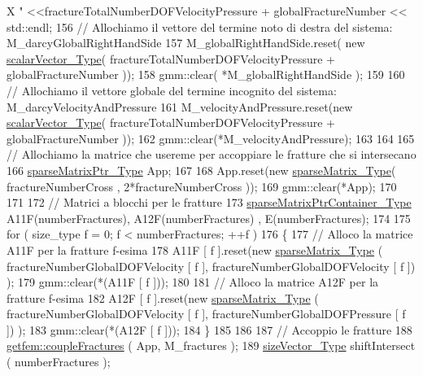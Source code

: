 \begin{DoxyCode}
{       X "} <<fractureTotalNumberDOFVelocityPressure + globalFractureNumber << std::endl;   
156     \textcolor{comment}{// Allochiamo il vettore del termine noto di destra del sistema: M\_darcyGlobalRightHandSide}
157     M\_globalRightHandSide.reset( \textcolor{keyword}{new} \hyperlink{Core_8h_a4e75b5863535ba1dd79942de2846eff0}{scalarVector\_Type}( 
      fractureTotalNumberDOFVelocityPressure + globalFractureNumber ));
158     gmm::clear( *M\_globalRightHandSide );
159 
160     \textcolor{comment}{// Allochiamo il vettore globale del termine incognito del sistema: M\_darcyVelocityAndPressure}
161     M\_velocityAndPressure.reset(\textcolor{keyword}{new} \hyperlink{Core_8h_a4e75b5863535ba1dd79942de2846eff0}{scalarVector\_Type}( 
      fractureTotalNumberDOFVelocityPressure + globalFractureNumber ));
162     gmm::clear(*M\_velocityAndPressure);
163 
164     
165     \textcolor{comment}{// Allochiamo la matrice che usereme per accoppiare le fratture che si intersecano}
166     \hyperlink{Core_8h_a87137a9501b38c724ac80bc955164bb7}{sparseMatrixPtr\_Type}  App;
167 
168     App.reset(\textcolor{keyword}{new} \hyperlink{Core_8h_afba9f623673e2ae32054015bdb5500f9}{sparseMatrix\_Type}( fractureNumberCross , 2*fractureNumberCross ));
169     gmm::clear(*App);
170 
171     
172     \textcolor{comment}{// Matrici a blocchi per le fratture}
173     \hyperlink{Core_8h_a2f5e086fbce840d40be38c016488fd91}{sparseMatrixPtrContainer\_Type} A11F(numberFractures), A12F(numberFractures)
      , E(numberFractures);
174 
175     \textcolor{keywordflow}{for} ( size\_type f = 0; f < numberFractures; ++f )
176     \{
177         \textcolor{comment}{// Alloco la matrice A11F per la fratture f-esima}
178         A11F [ f ].reset(\textcolor{keyword}{new} \hyperlink{Core_8h_afba9f623673e2ae32054015bdb5500f9}{sparseMatrix\_Type} ( fractureNumberGlobalDOFVelocity [ f ], 
      fractureNumberGlobalDOFVelocity [ f ]) );
179         gmm::clear(*(A11F [ f ]));
180 
181         \textcolor{comment}{// Alloco la matrice A12F per la fratture f-esima}
182         A12F [ f ].reset(\textcolor{keyword}{new} \hyperlink{Core_8h_afba9f623673e2ae32054015bdb5500f9}{sparseMatrix\_Type} ( fractureNumberGlobalDOFVelocity [ f ], 
      fractureNumberGlobalDOFPressure [ f ]) );
183         gmm::clear(*(A12F [ f ]));
184     \}
185 
186     
187     \textcolor{comment}{// Accoppio le fratture}
188     \hyperlink{namespacegetfem_a9a0b9f7498668cda8b547b10ac914a34}{getfem::coupleFractures} ( App, M\_fractures );
189     \hyperlink{Core_8h_a83c51913d041a5001e8683434c09857f}{sizeVector\_Type} shiftIntersect ( numberFractures );

\end{DoxyCode}
